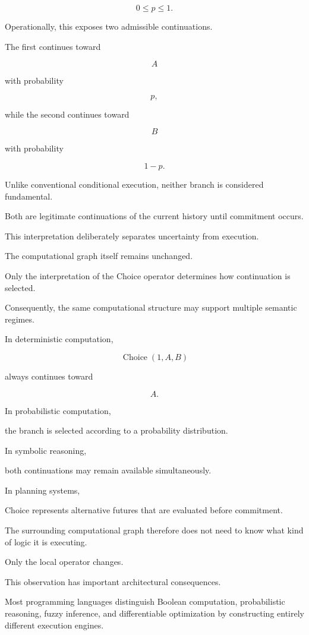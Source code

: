 \documentclass[12pt,oneside]{article}
\theoremstyle{definition}
\theoremstyle{remark}
\begin{document}
\[
0\le p\le1.
\]

Operationally, this exposes two admissible continuations.

The first continues toward

\[
A
\]

with probability

\[
p,
\]

while the second continues toward

\[
B
\]

with probability

\[
1-p.
\]

Unlike conventional conditional execution, neither branch is considered
fundamental.

Both are legitimate continuations of the current history until commitment
occurs.

This interpretation deliberately separates uncertainty from execution.

The computational graph itself remains unchanged.

Only the interpretation of the Choice operator determines how continuation is
selected.

Consequently, the same computational structure may support multiple semantic
regimes.

In deterministic computation,

\[
\operatorname{Choice}(1,A,B)
\]

always continues toward

\[
A.
\]

In probabilistic computation,

the branch is selected according to a probability distribution.

In symbolic reasoning,

both continuations may remain available simultaneously.

In planning systems,

Choice represents alternative futures that are evaluated before commitment.

The surrounding computational graph therefore does not need to know what kind
of logic it is executing.

Only the local operator changes.

This observation has important architectural consequences.

Most programming languages distinguish Boolean computation, probabilistic
reasoning, fuzzy inference, and differentiable optimization by constructing
entirely different execution engines.
\end{document}
